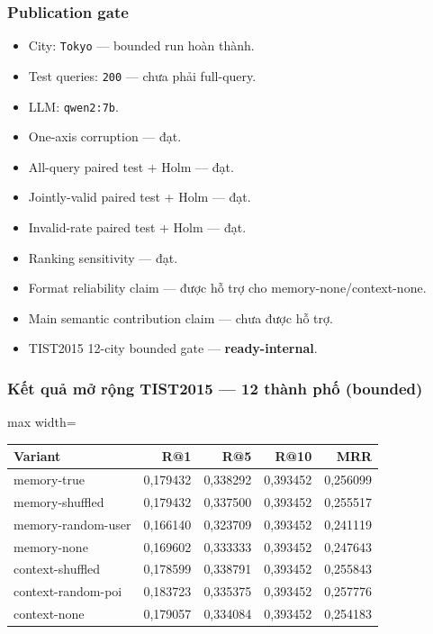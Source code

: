 \subsubsection*{Publication gate}

\begin{itemize}
\item City: \texttt{Tokyo} --- bounded run hoàn thành.
\item Test queries: \texttt{200} --- chưa phải full-query.
\item LLM: \texttt{qwen2:7b}.
\item One-axis corruption --- đạt.
\item All-query paired test + Holm --- đạt.
\item Jointly-valid paired test + Holm --- đạt.
\item Invalid-rate paired test + Holm --- đạt.
\item Ranking sensitivity --- đạt.
\item Format reliability claim --- được hỗ trợ cho memory-none/context-none.
\item Main semantic contribution claim --- chưa được hỗ trợ.
\item TIST2015 12-city bounded gate --- \textbf{ready-internal}.
\end{itemize}

\subsubsection*{Kết quả mở rộng TIST2015 --- 12 thành phố (bounded)}

\begin{table}[!htbp]
\centering
\scriptsize
\setlength{\tabcolsep}{2.5pt}
\begin{adjustbox}{max width=\textwidth}
\begin{tabular}{@{}lrrrr@{}}
\toprule
Variant & R@1 & R@5 & R@10 & MRR \\
\midrule
memory-true & 0,179432 & 0,338292 & 0,393452 & 0,256099 \\
memory-shuffled & 0,179432 & 0,337500 & 0,393452 & 0,255517 \\
memory-random-user & 0,166140 & 0,323709 & 0,393452 & 0,241119 \\
memory-none & 0,169602 & 0,333333 & 0,393452 & 0,247643 \\
context-shuffled & 0,178599 & 0,338791 & 0,393452 & 0,255843 \\
context-random-poi & 0,183723 & 0,335375 & 0,393452 & 0,257776 \\
context-none & 0,179057 & 0,334084 & 0,393452 & 0,254183 \\
\bottomrule
\end{tabular}
\end{adjustbox}
\end{table}

